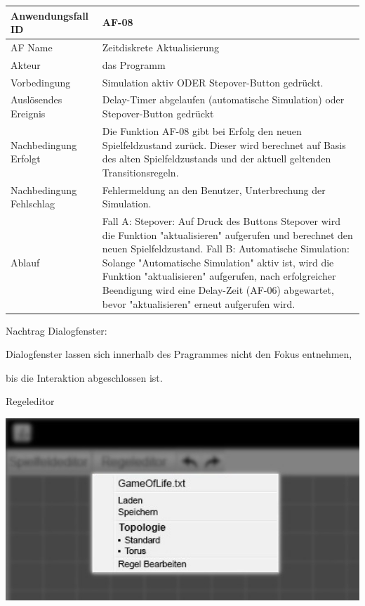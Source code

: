 \documentclass[11pt,a4paper]{article}
\begin{document}
\begin{tabular}[m]{|m{7cm}|m{9cm}|}
    \hline
    Anwendungsfall ID     & AF-08 \\
         \hline
    AF Name     & Zeitdiskrete Aktualisierung \\
         \hline
    Akteur&das Programm \\
    \hline
    Vorbedingung&Simulation aktiv ODER Stepover-Button gedrückt.  \\  %
    \hline
    Auslösendes Ereignis&Delay-Timer abgelaufen (automatische Simulation) oder Stepover-Button gedrückt\\
    \hline
    Nachbedingung Erfolgt& Die Funktion AF-08 gibt bei Erfolg den neuen Spielfeldzustand zurück. Dieser wird berechnet auf Basis des alten Spielfeldzustands und der aktuell geltenden Transitionsregeln.\\
    \hline
    Nachbedingung Fehlschlag&Fehlermeldung an den Benutzer, Unterbrechung der Simulation.\\
    \hline
    Ablauf&Fall A: Stepover: Auf Druck des Buttons Stepover wird die Funktion "aktualisieren" aufgerufen und berechnet den neuen Spielfeldzustand.
    \linebreak
    Fall B: Automatische Simulation: Solange "Automatische Simulation" aktiv ist, wird die Funktion "aktualisieren" aufgerufen, nach erfolgreicher Beendigung wird eine  Delay-Zeit (AF-06) abgewartet, bevor "aktualisieren" erneut aufgerufen wird. \\
    \hline
    
\end{tabular}
\par
\medskip 
Nachtrag Dialogfenster: 
\par
Dialogfenster lassen sich innerhalb des Pragrammes nicht den Fokus entnehmen, \par bis die Interaktion abgeschlossen ist.
\pagebreak

    Regeleditor %

\par
\includegraphics[width=15cm]{regeleditor_dropdown_edit} %
\end{document}
